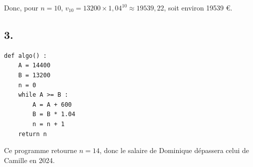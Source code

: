 Donc, pour \( n = 10 \), \( v_{10} = 13200 \times 1{,}04^{10} \approx 19539{,}22 \), soit environ 19539 €.

\subsection*{3.}

\begin{center}
\begin{lstlisting}[style=python]
def algo() :
    A = 14400
    B = 13200
    n = 0
    while A >= B :
        A = A + 600
        B = B * 1.04
        n = n + 1
    return n
\end{lstlisting}
\end{center}

Ce programme retourne \( n = 14 \), donc le salaire de Dominique dépassera celui de Camille en 2024.
